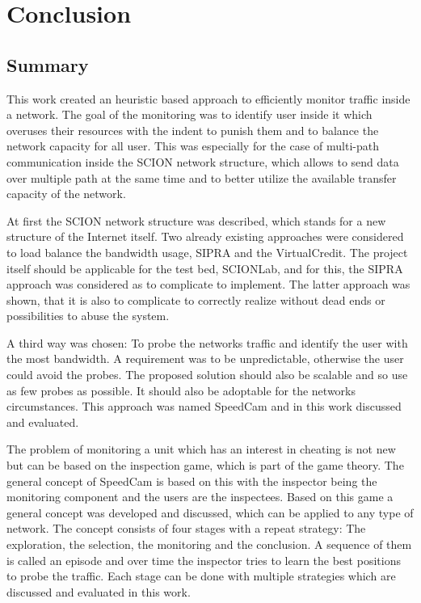 \documentclass[thesis.tex]{subfiles}
\begin{document}
\chapter{Conclusion}\label{chap:concl}

\section{Summary}
This work created an heuristic based approach to efficiently monitor traffic inside a network. The goal of the monitoring was to identify user inside it which overuses their resources with the indent to punish them and to balance the network capacity for all user. This was especially for the case of multi-path communication inside the SCION network structure, which allows to send data over multiple path at the same time and to better utilize the available transfer capacity of the network. 

At first the SCION network structure was described, which stands for a new structure of the Internet itself. Two already existing approaches were considered to load balance the bandwidth usage, SIPRA and the VirtualCredit. The project itself should be applicable for the test bed, SCIONLab, and for this, the SIPRA approach was considered as to complicate to implement. The latter approach was shown, that it is also to complicate to correctly realize without dead ends or possibilities to abuse the system.

A third way was chosen: To probe the networks traffic and identify the user with the most bandwidth. A requirement was to be unpredictable, otherwise the user could avoid the probes. The proposed solution should also be scalable and so use as few probes as possible. It should also be adoptable for the networks circumstances. This approach was named SpeedCam and in this work discussed and evaluated.

The problem of monitoring a unit which has an interest in cheating is not new but can be based on the inspection game, which is part of the game theory. The general concept of SpeedCam is based on this with the inspector being the monitoring component and the users are the inspectees. Based on this game a general concept was developed and discussed, which can be applied to any type of network. The concept consists of four stages with a repeat strategy: The exploration, the selection, the monitoring and the conclusion. A sequence of them is called an episode and over time the inspector tries to learn the best positions to probe the traffic. Each stage can be done with multiple strategies which are discussed and evaluated in this work. 
\end{document}
